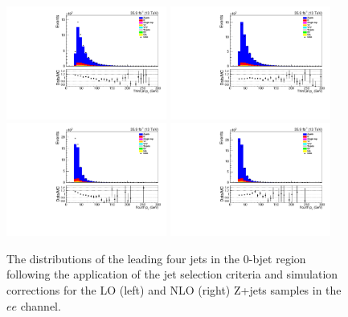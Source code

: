 \begin{figure}[htbp]
\includegraphics[width=0.47\textwidth]{figs/background-estimation/plots/unblinded/DY_control_old_prompt_ee_ttbarInc/thirdJetPt_SingleTop_jetSel_ee.pdf}
\includegraphics[width=0.47\textwidth]{figs/background-estimation/plots/unblinded/DY_control_old_prompt_ee_DYamcatnlo/thirdJetPt_SingleTop_jetSel_ee.pdf}
\\
\includegraphics[width=0.47\textwidth]{figs/background-estimation/plots/unblinded/DY_control_old_prompt_ee_ttbarInc/fourthJetPt_SingleTop_jetSel_ee.pdf}
\includegraphics[width=0.47\textwidth]{figs/background-estimation/plots/unblinded/DY_control_old_prompt_ee_DYamcatnlo/fourthJetPt_SingleTop_jetSel_ee.pdf}
\caption{
The distributions of the leading four jets \pt in the 0-bjet region following the application of the jet selection criteria and simulation corrections for the LO (left) and NLO (right) Z+jets samples in the $ee$ channel.
}
\label{fig:zPlusCR_jetPt}
\end{figure}


